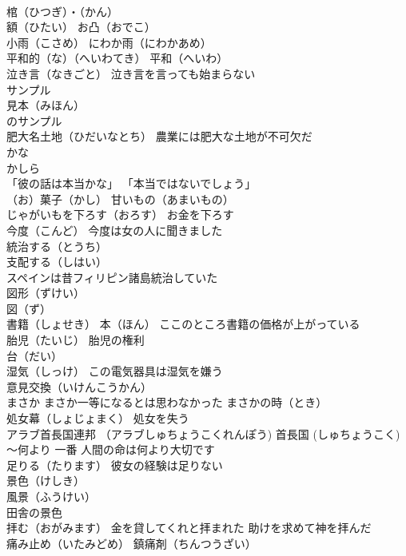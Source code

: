 \documentclass[8pt]{extreport}
\begin{document}
\begin{CJK}{UTF8}{min}
\\	棺（ひつぎ）・（かん）
\\	額（ひたい） お凸（おでこ）
\\	小雨（こさめ） にわか雨（にわかあめ）
\\	平和的（な）（へいわてき） 平和（へいわ）
\\	泣き言（なきごと） 泣き言を言っても始まらない
\\	サンプル 
\\	見本（みほん） 
\\	のサンプル
\\	肥大名土地（ひだいなとち） 農業には肥大な土地が不可欠だ
\\	かな 
\\	かしら 
\\	「彼の話は本当かな」 「本当ではないでしょう」
\\	（お）菓子（かし） 甘いもの（あまいもの）
\\	じゃがいもを下ろす（おろす） お金を下ろす
\\	今度（こんど） 今度は女の人に聞きました
\\	統治する（とうち）
\\	支配する（しはい） 
\\	スペインは昔フィリピン諸島統治していた
\\	図形（ずけい）
\\	図（ず） 
\\	書籍（しょせき） 本（ほん） ここのところ書籍の価格が上がっている
\\	胎児（たいじ） 胎児の権利
\\	台（だい）
\\	湿気（しっけ） この電気器具は湿気を嫌う
\\	意見交換（いけんこうかん）
\\	まさか まさか一等になるとは思わなかった まさかの時（とき）
\\	処女幕（しょじょまく） 処女を失う
\\	アラブ首長国連邦 （アラブしゅちょうこくれんぽう) 首長国 (しゅちょうこく)
\\	～何より 一番 人間の命は何より大切です
\\	足りる（たります） 彼女の経験は足りない
\\	景色（けしき）
\\	風景（ふうけい） 
\\	田舎の景色
\\	拝む（おがみます） 金を貸してくれと拝まれた 助けを求めて神を拝んだ
\\	痛み止め（いたみどめ） 鎮痛剤（ちんつうざい）

\end{CJK}
\end{document}
